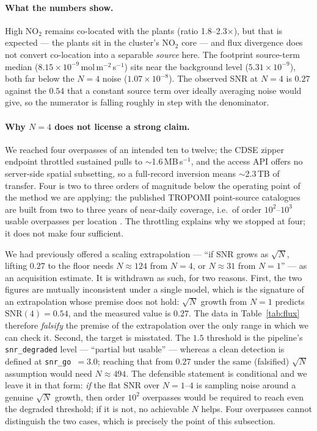 \documentclass[11pt,a4paper]{article}
\providecommand{\ce}[1]{\ensuremath{\mathrm{#1}}}
\begin{document}
\paragraph{What the numbers show.} High \ce{NO_2} remains co-located with the plants (ratio
1.8--2.3$\times$), but that is expected --- the plants sit in the cluster's \ce{NO_2} core --- and
flux divergence does not convert co-location into a separable \emph{source} here. The footprint
source-term median ($8.15\times10^{-9}$\,mol\,m$^{-2}$\,s$^{-1}$) sits near the background level
($5.31\times10^{-9}$), both far below the $N{=}4$ noise ($1.07\times10^{-8}$). The observed SNR
at $N{=}4$ is $0.27$ against the $0.54$ that a constant source term over ideally averaging noise
would give, so the numerator is falling roughly in step with the denominator.

\paragraph{Why $N{=}4$ does not license a strong claim.} We reached four overpasses of an intended
ten to twelve; the CDSE zipper endpoint throttled sustained pulls to $\sim$1.6\,MB\,s$^{-1}$, and
the access API offers no server-side spatial subsetting, so a full-record inversion means
$\sim$2.3\,TB of transfer. Four is two to three orders of magnitude below the operating point of
the method we are applying: the published TROPOMI point-source catalogues are built from two to
three years of near-daily coverage, i.e.\ of order $10^2$--$10^3$ usable overpasses per location
\citep{beirle_2021,beirle_2023}. The throttling explains why we stopped at four; it does not make
four sufficient.

We had previously offered a scaling extrapolation --- ``if SNR grows as $\sqrt{N}$, lifting $0.27$
to the floor needs $N\approx124$ from $N{=}4$, or $N\approx31$ from $N{=}1$'' --- as an
acquisition estimate. It is withdrawn as such, for two reasons. First, the two figures are
mutually inconsistent under a single model, which is the signature of an extrapolation whose
premise does not hold: $\sqrt{N}$ growth from $N{=}1$ predicts $\mathrm{SNR}(4)=0.54$, and the
measured value is $0.27$. The data in Table~\ref{tab:flux} therefore \emph{falsify} the premise of
the extrapolation over the only range in which we can check it. Second, the target is misstated.
The $1.5$ threshold is the pipeline's \texttt{snr\_degraded} level --- ``partial but usable'' ---
whereas a clean detection is defined at \texttt{snr\_go}~$=3.0$; reaching that from $0.27$ under
the same (falsified) $\sqrt{N}$ assumption would need $N\approx494$. The defensible statement is
conditional and we leave it in that form: \emph{if} the flat SNR over $N=1$--$4$ is sampling noise
around a genuine $\sqrt{N}$ growth, then order $10^2$ overpasses would be required to reach even
the degraded threshold; if it is not, no achievable $N$ helps. Four overpasses cannot distinguish
the two cases, which is precisely the point of this subsection.
\end{document}
